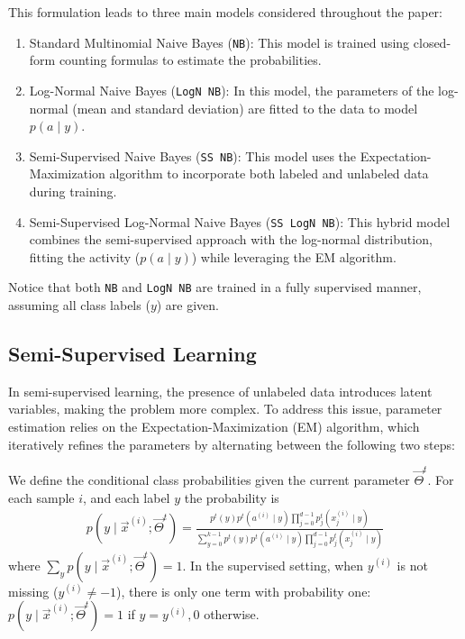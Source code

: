 \newpage
{}  
This formulation leads to three main models considered throughout the paper:  

\begin{enumerate}
    \item Standard Multinomial Naive Bayes (\texttt{NB}):  
    This model is trained using closed-form counting formulas to estimate the probabilities.

    \item Log-Normal Naive Bayes (\texttt{LogN NB}):
    In this model, the parameters of the log-normal (mean and standard deviation) are fitted to the data to model \(p(a \mid y)\).
    
    \item Semi-Supervised Naive Bayes (\texttt{SS NB}):
    This model uses the Expectation-Maximization algorithm to incorporate both labeled and unlabeled data during training.
    
    \item Semi-Supervised Log-Normal Naive Bayes (\texttt{SS LogN NB}):
    This hybrid model combines the semi-supervised approach with the log-normal distribution, fitting the activity (\(p(a \mid y)\)) while leveraging the EM algorithm.
\end{enumerate}
Notice that both \texttt{NB} and \texttt{LogN NB} are trained in a fully supervised manner, assuming all class labels (\(y\)) are given.  


\subsection{Semi-Supervised Learning}  
In semi-supervised learning, the presence of unlabeled data introduces latent variables, making the problem more complex.
To address this issue, parameter estimation relies on the Expectation-Maximization (EM) algorithm, which iteratively refines the parameters by alternating between the following two steps:

 We define the conditional class probabilities given the current parameter $\vec{\Theta}^{t}$. For each sample $i$, and each label $y$ the probability is
\begin{align*}
    p(y \mid \vec{x}^{(i)};\vec{\Theta}^{t})= 
    \frac{p^{t}(y) p^{t}(a^{(i)} \mid y) \prod_{j=0}^{d-1} p^{t}_j(x_j^{(i)} \mid y)}{\sum_{y=0}^{k-1} p^{t}(y) p^{t}(a^{(i)} \mid y) \prod_{j=0}^{d-1} p^{t}_j(x_j^{(i)} \mid y)}
\end{align*} where $\sum_y p(y \mid \vec{x}^{(i)};\vec{\Theta}^{t}) = 1$. In the supervised setting, when $y^{(i)}$ is not missing ($y^{(i)}\neq -1$), there is only one term with probability one: $ p(y \mid \vec{x}^{(i)};\vec{\Theta}^{t})=1$ if $y=y^{(i)}, 0$ otherwise.

